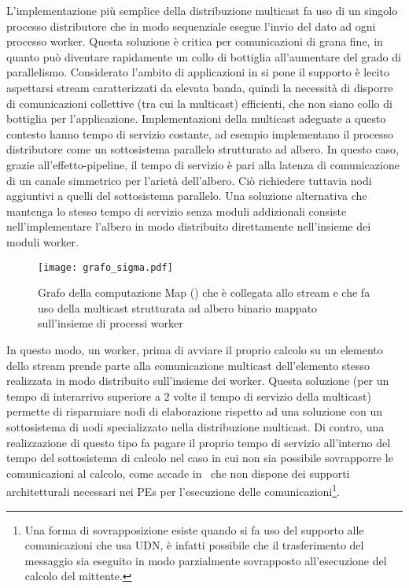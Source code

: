 L'implementazione pi\`u semplice della distribuzione multicast fa uso di un singolo processo distributore che in modo sequenziale esegue l'invio del dato ad ogni processo worker. Questa soluzione \`e critica per comunicazioni di grana fine, in quanto pu\`o diventare rapidamente un collo di bottiglia all'aumentare del grado di parallelismo. Considerato l'ambito di applicazioni in si pone il supporto \`e lecito aspettarsi stream caratterizzati da elevata banda, quindi la necessit\`a di disporre di comunicazioni collettive (tra cui la multicast) efficienti, che non siano collo di bottiglia per l'applicazione. Implementazioni della multicast adeguate a questo contesto hanno tempo di servizio costante, ad esempio implementano il processo distributore come un sottosistema parallelo strutturato ad albero. In questo caso, grazie all'effetto-pipeline, il tempo di servizio \`e pari alla latenza di comunicazione di un canale simmetrico per l'ariet\`a dell'albero. Ci\`o richiedere tuttavia nodi aggiuntivi a quelli del sottosistema parallelo. Una soluzione alternativa che mantenga lo stesso tempo di servizio senza moduli addizionali consiste nell'implementare l'albero in modo distribuito direttamente nell'insieme dei moduli worker.
\begin{figure}[!t]
  \centering
  \texttt{[image: grafo\_sigma.pdf]}
  \caption[Computazione dell'implementazione parallela del benchmark]{Grafo della computazione Map (\subsystem) che \`e collegata allo stream e che fa uso della multicast strutturata ad albero binario mappato sull'insieme di processi worker}
  \label{fig:grafo_map}
\end{figure}
In questo modo, un worker, prima di avviare il proprio calcolo su un elemento dello stream prende parte alla comunicazione multicast dell'elemento stesso realizzata in modo distribuito sull'insieme dei worker. Questa soluzione (per un tempo di interarrivo superiore a 2 volte il tempo di servizio della multicast) permette di risparmiare nodi di elaborazione rispetto ad una soluzione con un sottosistema di nodi specializzato nella distribuzione multicast. 
Di contro, una realizzazione di questo tipo fa pagare il proprio tempo di servizio all'interno del tempo del sottosistema di calcolo nel caso in cui non sia possibile sovrapporre le comunicazioni al calcolo, come accade in \tile\ che non dispone dei supporti architetturali necessari nei PEs per l'esecuzione delle comunicazioni\footnote{Una forma di sovrapposizione esiste quando si fa uso del supporto alle comunicazioni che usa UDN, \`e infatti possibile che il trasferimento del messaggio sia eseguito in modo parzialmente sovrapposto all'esecuzione del calcolo del mittente.}.

